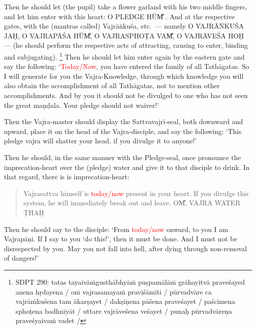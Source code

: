 \documentclass[11pt]{book}
\makeatletter
\def\fakesc#1{%
  \begingroup%
  \xdef\fake@name{\csname\curr@fontshape/\f@size\endcsname}%
  \fontsize{1.3\fontdimen8\fake@name}{\baselineskip}\selectfont%
  \uppercase{#1}%
  \endgroup%
}
\newcommand{\mantra}[1]{\fakesc{#1}}
\newcommand{\red}[1]{\textcolor{red}{#1}}
\makeatother
\begin{document}
Then he should let (the pupil) take a flower garland with his two middle fingers, and let him enter with this heart: \mantra{o pledge hūm̐}. And at the respective gates, with the (mantras called) Vajrāṅkuśa, etc.\ — namely \mantra{o vajrāṅkuśa jaḥ, o vajrapāśa hūm̐,  o vajrasphoṭa vam̐, o vajrāveśa hoḥ} — (he should perform the respective acts of attracting, causing to enter, binding and subjugating). \footnote{SDPT 290: 
tatas tayaivāṁgusthābhyāṁ puṣpamālāṁ grāhayitvā praveśayed anena hṛdayena / oṁ vajrasamayaṁ praviśāmīti / pūrvadvāre ca vajrāṁkuśena tam ākarṣayet / dakṣiṇena pāśena praveśayet / paścimena sphoṭena badhnīyāt / uttare vajrāveśena veśayet / punaḥ pūrvadvāreṇa praveśyaivaṁ vadet /} Then he should let him enter again by the eastern gate and say the following: `\red{Today/Now}, you have entered the family of all Tathāgatas. So I will generate for you the Vajra-Knowledge, through which knowledge you will also obtain the accomplishment of all Tathāgatas, not to mention other accomplishments. And by you it should not be divulged to one who has not seen the great maṇḍala. Your pledge should not waiver!'

Then the Vajra-master should display the Sattvavajrī-seal, both downward and upward, place it on the head of the Vajra-disciple, and say the following: `This pledge vajra will shatter your head, if you divulge it to anyone!'

Then he should, in the same manner with the Pledge-seal, once pronounce the imprecation-heart over the (pledge) water and give it to that disciple to drink. In that regard, there is is imprecation-heart:
 
\begin{verse}
Vajrasattva himself is \red{today/now} present in your heart. If you divulge this system, he will immediately break out and leave. \mantra{om̐, vajra water ṭhaḥ}
\end{verse}

Then he should say to the disciple: `From \red{today/now} onward, to you I am Vajrapāṇi. If I say to you `do this!', then it must be done. And I must not be disrespected by you. May you not fall into hell, after dying through non-removal of dangers!'
\end{document}
